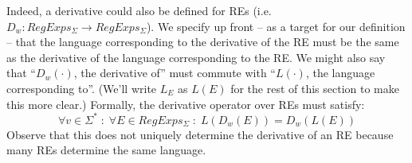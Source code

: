 Indeed, a derivative could also be defined for REs (i.e.\ $D_w : RegExps_\Sigma \to RegExps_\Sigma$). We specify up front -- as a target for our definition -- that the language corresponding to the derivative of the RE must be the same as the derivative of the language corresponding to the RE. We might also say that ``$D_w(\cdot)$, the derivative of'' must commute with ``$L(\cdot)$, the language corresponding to''. (We'll write $L_E$ as $L(E)$ for the rest of this section to make this more clear.) Formally, the derivative operator over REs must satisfy:
\begin{equation}\label{eq:deriv_re:spec}
	\forall v\in \Sigma^* \;:\; \forall E\in RegExps_\Sigma \;:\; L(D_w(E)) = D_w(L(E))
\end{equation}
Observe that this does not uniquely determine the derivative of an RE because many REs determine the same language.

